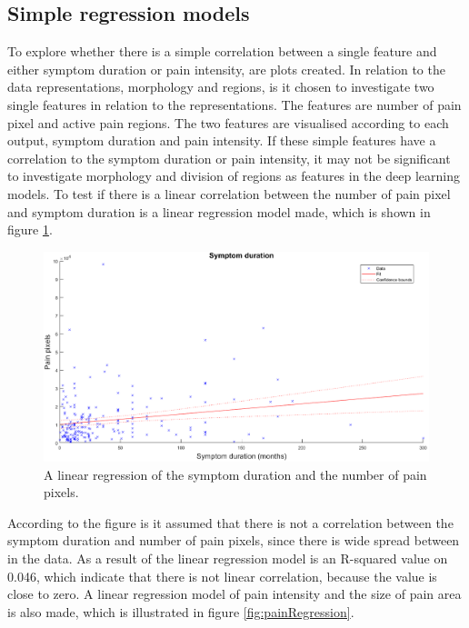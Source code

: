 \subsection{Simple regression models}
To explore whether there is a simple correlation between a single feature and either symptom duration or pain intensity, are plots created. In relation to the data representations, morphology and regions, is it chosen to investigate two single features in relation to the representations. The features are number of pain pixel and active pain regions. The two features are visualised according to each output, symptom duration and pain intensity.
If these simple features have a correlation to the symptom duration or pain intensity, it may not be significant to investigate morphology and division of regions as features in the deep learning models. 
\noindent
To test if there is a linear correlation between the number of pain pixel and symptom duration is a linear regression model made, which is shown in figure \ref{fig:durationRegression}. 
\newline

\begin{figure} [H]
\centering
\includegraphics[width=1\textwidth]{figures/durationRegression}
\caption{A linear regression of the symptom duration and the number of pain pixels.}
\label{fig:durationRegression}
\end{figure}

\noindent
According to the figure is it assumed that there is not a correlation between the symptom duration and number of pain pixels, since there is wide spread between in the data. As a result of the linear regression model is an R-squared value on 0.046, which indicate that there is not linear correlation, because the value is close to zero.
\noindent
A linear regression model of pain intensity and the size of pain area is also made, which is illustrated in figure \ref{fig:painRegression}. \newline

